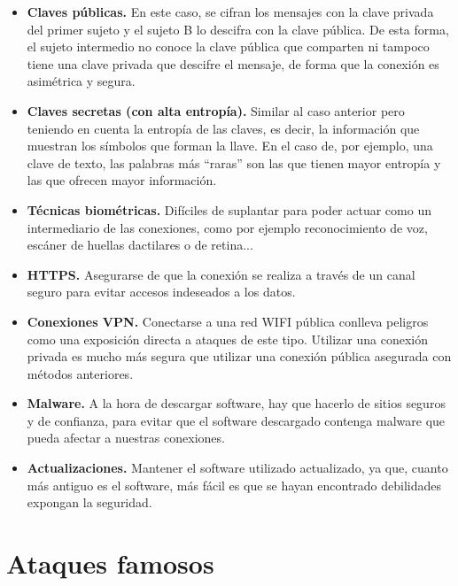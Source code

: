\documentclass[11pt,a4paper]{article}
\begin{document}
\begin{itemize}
    \item \textbf{Claves públicas.} En este caso, se cifran los mensajes con la clave privada del primer sujeto y el sujeto B lo descifra con la clave pública. De esta forma, el sujeto intermedio no conoce la clave pública que comparten ni tampoco tiene una clave privada que descifre el mensaje, de forma que la conexión es asimétrica y segura.
    \item \textbf{Claves secretas (con alta entropía).} Similar al caso anterior pero teniendo en cuenta la entropía de las claves, es decir, la información que muestran los símbolos que forman la llave. En el caso de, por ejemplo, una clave de texto, las palabras más ``raras'' son las que tienen mayor entropía y las que ofrecen mayor información.
    \item \textbf{Técnicas biométricas.} Difíciles de suplantar para poder actuar como un intermediario de las conexiones, como por ejemplo reconocimiento de voz, escáner de huellas dactilares o de retina...
    \item \textbf{HTTPS.} Asegurarse de que la conexión se realiza a través de un canal seguro para evitar accesos indeseados a los datos.
    \item \textbf{Conexiones VPN.} Conectarse a una red WIFI pública conlleva peligros como una exposición directa a ataques de este tipo. Utilizar una conexión privada es mucho más segura que utilizar una conexión pública asegurada con métodos anteriores.
    \item \textbf{Malware.} A la hora de descargar software, hay que hacerlo de sitios seguros y de confianza, para evitar que el software descargado contenga malware que pueda afectar a nuestras conexiones.
    \item \textbf{Actualizaciones.} Mantener el software utilizado actualizado, ya que, cuanto más antiguo es el software, más fácil es que se hayan encontrado debilidades expongan la seguridad.
\end{itemize}

\section{Ataques famosos}
\end{document}
